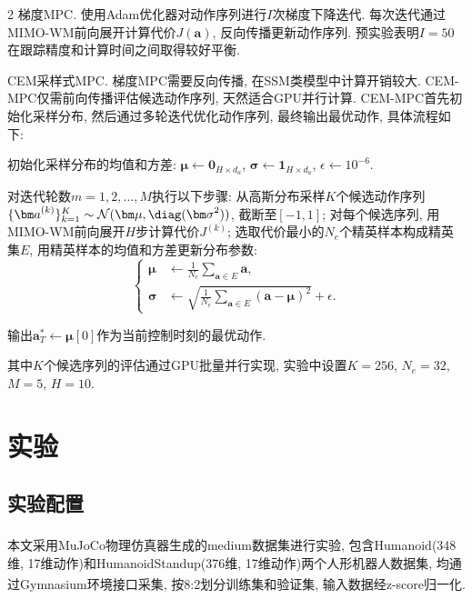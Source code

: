 \begin{multicols}{2}
梯度MPC.
使用Adam优化器对动作序列进行$I$次梯度下降迭代.
每次迭代通过MIMO-WM前向展开计算代价$J({\bm a})$, 反向传播更新动作序列.
预实验表明$I{=}50$在跟踪精度和计算时间之间取得较好平衡.

CEM采样式MPC.
梯度MPC需要反向传播, 在SSM类模型中计算开销较大.
CEM-MPC仅需前向传播评估候选动作序列, 天然适合GPU并行计算.
CEM-MPC首先初始化采样分布, 然后通过多轮迭代优化动作序列, 最终输出最优动作, 具体流程如下:
\setcounter{Ste}{0}
\begin{Ste}初始化采样分布的均值和方差:
${\bm \mu} \leftarrow {\bm 0}_{H \times d_a}$, ${\bm \sigma} \leftarrow {\bm 1}_{H \times d_a}$, $\epsilon \leftarrow 10^{-6}$.\end{Ste}
\begin{Ste}对迭代轮数$m = 1, 2, \ldots, M$执行以下步骤:
从高斯分布采样$K$个候选动作序列
$\{{\bm a}^{(k)}\}_{k=1}^K \sim \mathcal{N}({\bm \mu}, \diag({\bm \sigma}^2))$, 截断至$[-1, 1]$;
对每个候选序列, 用MIMO-WM前向展开$H$步计算代价$J^{(k)}$;
选取代价最小的$N_e$个精英样本构成精英集$E$,
用精英样本的均值和方差更新分布参数:
\begin{equation}
\left\{\begin{aligned}
{\bm \mu} &\leftarrow \frac{1}{N_e}\sum_{{\bm a} \in E} {\bm a},\\
{\bm \sigma} &\leftarrow \sqrt{\frac{1}{N_e}\sum_{{\bm a} \in E} ({\bm a} - {\bm \mu})^2} + \epsilon.
\end{aligned}\right.
\end{equation}
\end{Ste}
\begin{Ste}输出${\bm a}_T^* \leftarrow {\bm \mu}[0]$作为当前控制时刻的最优动作.\end{Ste}

其中$K$个候选序列的评估通过GPU批量并行实现,
实验中设置$K{=}256$, $N_e{=}32$, $M{=}5$, $H{=}10$.

\section{实验}

\subsection{实验配置}

本文采用MuJoCo\textsuperscript{\cite{28}}物理仿真器生成的medium数据集进行实验, 包含Humanoid(348维, 17维动作)和HumanoidStandup(376维, 17维动作)两个人形机器人数据集, 均通过Gymnasium\textsuperscript{\cite{29}}环境接口采集, 按8:2划分训练集和验证集, 输入数据经z-score归一化.


\end{multicols}
